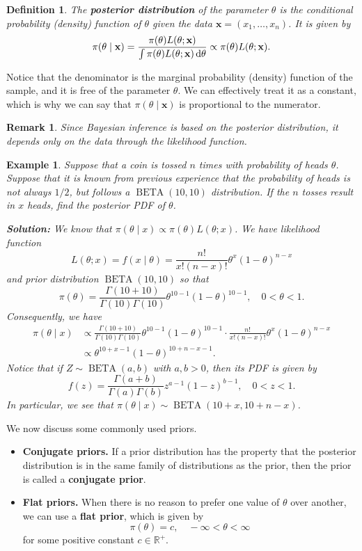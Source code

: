 \documentclass[10pt]{article}
\newcommand{\R}{\mathbb{R}}
\newcommand{\dd}{\,{\rm d}}
\DeclareMathOperator{\BETA}{BETA}
\theoremstyle{newstyle}
\newtheorem{remark}[thm]{Remark}
\newtheorem{defn}[thm]{Definition}
\newtheorem{exmp}[thm]{Example}
\begin{document}
\begin{defn} 
The {\bf posterior distribution} of the parameter $\theta$ is the conditional probability 
(density) function of $\theta$ given the data $\mathbf x = (x_1, \dots, x_n)$. It is given by 
\[ \pi(\theta \mid \mathbf x) = \frac{\pi(\theta) L(\theta; \mathbf x)}{\int \pi(\theta) 
L(\theta; \mathbf x)\dd\theta} \propto \pi(\theta) L(\theta; \mathbf x). \]
\end{defn}
Notice that the denominator is the marginal probability (density) function of the sample, and 
it is free of the parameter $\theta$. We can effectively treat it as a constant, which is 
why we can say that $\pi(\theta \mid \mathbf x)$ is proportional to the numerator. 

\begin{remark}
Since Bayesian inference is based on the posterior distribution, it depends only on the data 
through the likelihood function. 
\end{remark}

\begin{exmp}
Suppose that a coin is tossed $n$ times with probability of heads $\theta$. Suppose that 
it is known from previous experience that the probability of heads is not always $1/2$, 
but follows a $\BETA(10, 10)$ distribution. If the $n$ tosses result in $x$ heads, find the 
posterior PDF of $\theta$. 

{\color{blue} 
{\bf Solution:} We know that $\pi(\theta \mid x) \propto \pi(\theta) L(\theta; x)$. 
We have likelihood function 
\[ L(\theta; x) = f(x \mid \theta) = \frac{n!}{x!(n-x)!} \theta^x (1-\theta)^{n-x} \]
and prior distribution $\BETA(10, 10)$ so that 
\[ \pi(\theta) = \frac{\Gamma(10+10)}{\Gamma(10)\Gamma(10)} \theta^{10-1} (1-\theta)^{10-1}, 
\quad 0 < \theta < 1. \]
Consequently, we have 
\begin{align*}
    \pi(\theta \mid x) &\propto \frac{\Gamma(10+10)}{\Gamma(10)\Gamma(10)} \theta^{10-1} (1-\theta)^{10-1}
    \cdot \frac{n!}{x!(n-x)!} \theta^x (1-\theta)^{n-x} \\
    &\propto \theta^{10+x-1} (1-\theta)^{10+n-x-1}. 
\end{align*}
Notice that if $Z \sim \BETA(a, b)$ with $a, b > 0$, then its PDF is given by 
\[ f(z) = \frac{\Gamma(a+b)}{\Gamma(a)\Gamma(b)} z^{a-1} (1-z)^{b-1}, \quad 0 < z < 1. \] 
In particular, we see that $\pi(\theta \mid x) \sim \BETA(10 + x, 10 + n - x)$.}
\end{exmp}

We now discuss some commonly used priors. 
\begin{itemize}
    \item 
    {\bf Conjugate priors.} 
    If a prior distribution has the property that the posterior distribution is in the 
    same family of distributions as the prior, then the prior is called a {\bf conjugate prior}. 
    \item {\bf Flat priors.}
    When there is no reason to prefer one value of $\theta$ over another, we can use a 
    {\bf flat prior}, which is given by 
    \[ \pi(\theta) = c, \quad -\infty < \theta < \infty \]
    for some positive constant $c \in \R^+$. 
\end{itemize}
\end{document}
